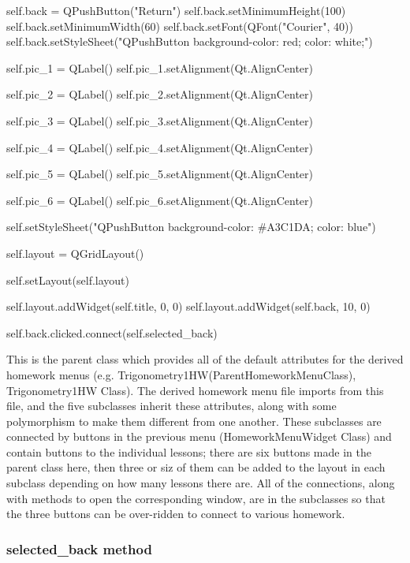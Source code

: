 \begin{python}
        self.back = QPushButton("Return")
        self.back.setMinimumHeight(100)
        self.back.setMinimumWidth(60)
        self.back.setFont(QFont("Courier", 40))
        self.back.setStyleSheet("QPushButton {background-color: red; color: white;}")

        self.pic_1 = QLabel()
        self.pic_1.setAlignment(Qt.AlignCenter)

        self.pic_2 = QLabel()
        self.pic_2.setAlignment(Qt.AlignCenter)
        
        self.pic_3 = QLabel()
        self.pic_3.setAlignment(Qt.AlignCenter)
        
        self.pic_4 = QLabel()
        self.pic_4.setAlignment(Qt.AlignCenter)

        self.pic_5 = QLabel()
        self.pic_5.setAlignment(Qt.AlignCenter)
        
        self.pic_6 = QLabel()
        self.pic_6.setAlignment(Qt.AlignCenter)

        self.setStyleSheet("QPushButton {background-color: #A3C1DA; color: blue}")   

        self.layout = QGridLayout()

        self.setLayout(self.layout)

        self.layout.addWidget(self.title, 0, 0)
        self.layout.addWidget(self.back, 10, 0)

        self.back.clicked.connect(self.selected_back)
\end{python}

This is the parent class which provides all of the default attributes for the derived homework menus (e.g. Trigonometry1HW(ParentHomeworkMenuClass), Trigonometry1HW Class). The derived homework menu file imports from this file, and the five subclasses inherit these attributes, along with some polymorphism to make them different from one another. These subclasses are connected by buttons in the previous menu (HomeworkMenuWidget Class) and contain buttons to the individual lessons; there are six buttons made in the parent class here, then three or siz of them can be added to the layout in each subclass depending on how many lessons there are. All of the connections, along with methods to open the corresponding window, are in the subclasses so that the three buttons can be over-ridden to connect to various homework.

\subsubsection{selected\_back method}

